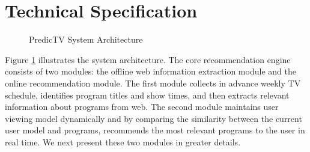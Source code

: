 \section{Technical Specification}
\label{sec:tech}

\begin{figure}[h]
\begin{center}
\caption{PredicTV System Architecture}
\shrink
\label{fig:archi}
\end{center}
\end{figure}

Figure \ref{fig:archi} illustrates the system architecture.
The core recommendation engine consists of two modules:
the offline web information extraction module and the online
recommendation module. The first module collects in advance weekly TV schedule,
identifies program titles and show times, and then extracts relevant
information about programs from web. 
The second module maintains user viewing model
dynamically and by comparing the similarity between the 
current user model and programs, 
recommends the most relevant programs to the user in real time.
We next present these two modules in greater details.

%
%

